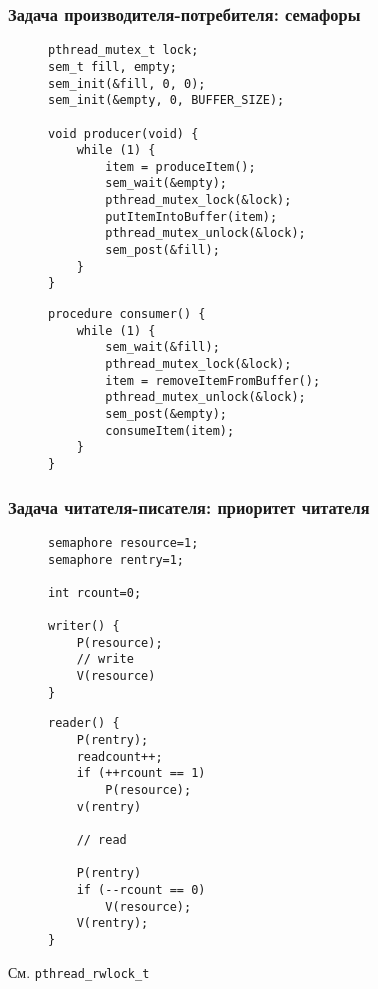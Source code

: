 \documentclass[aspectratio=169, pdf, 8pt, unicode]{beamer}
\begin{document}
\begin{frame}[fragile]
\frametitle{Задача производителя-потребителя: семафоры}
\begin{figure}[H]
\begin{minipage}{0.4\textwidth}
\begin{verbatim}
pthread_mutex_t lock;
sem_t fill, empty;
sem_init(&fill, 0, 0);
sem_init(&empty, 0, BUFFER_SIZE);

void producer(void) {
    while (1) {
        item = produceItem();
        sem_wait(&empty);
        pthread_mutex_lock(&lock);
        putItemIntoBuffer(item);
        pthread_mutex_unlock(&lock);
        sem_post(&fill);
    }
}
\end{verbatim}
\end{minipage}
\begin{minipage}{0.4\textwidth}
\begin{verbatim}
procedure consumer() {
    while (1) {
        sem_wait(&fill);
        pthread_mutex_lock(&lock);
        item = removeItemFromBuffer();
        pthread_mutex_unlock(&lock);
        sem_post(&empty);
        consumeItem(item);
    }
}
\end{verbatim}
\end{minipage}
\end{figure}
\end{frame}

\begin{frame}[fragile]
\frametitle{Задача читателя-писателя: приоритет читателя}
\begin{figure}[H]
\begin{minipage}{0.4\textwidth}
\begin{verbatim}
semaphore resource=1;
semaphore rentry=1;

int rcount=0;

writer() {
    P(resource);
    // write
    V(resource)
}
\end{verbatim}
\end{minipage}
\begin{minipage}{0.4\textwidth}
\begin{verbatim}
reader() {
    P(rentry);
    readcount++;
    if (++rcount == 1)
        P(resource);
    v(rentry)

    // read

    P(rentry)
    if (--rcount == 0)
        V(resource);
    V(rentry);
}
\end{verbatim}
\end{minipage}
\end{figure}
См. \texttt{pthread\_rwlock\_t}
\end{frame}
\end{document}
